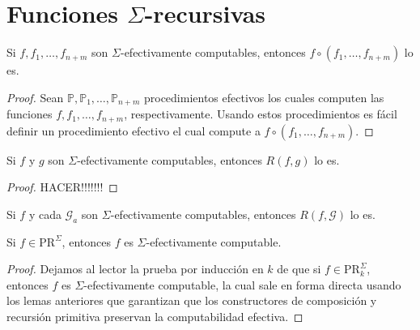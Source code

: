 \section{Funciones $\Sigma$-recursivas}

  \begin{lemma}
    \par Si $f, f_{1}, \dotsc, f_{n+m}$ son $\Sigma$-efectivamente computables, entonces $f \circ (f_{1}, \dotsc,
    f_{n+m})$ lo es.
  \end{lemma}
  \begin{proof}
    Sean $\mathbb{P}, \mathbb{P}_{1}, \dotsc, \mathbb{P}_{n+m}$ procedimientos efectivos los cuales computen las
    funciones $f, f_{1}, \dotsc, f_{n+m}$, respectivamente. Usando estos procedimientos es fácil definir un
    procedimiento efectivo el cual compute a $f \circ (f_{1},\dotsc,f_{n+m})$.
  \end{proof}

  \begin{lemma}
    \par Si $f$ y $g$ son $\Sigma $-efectivamente computables, entonces $R(f,g)$ lo es.
  \end{lemma}
  \begin{proof}
    HACER!!!!!!!
  \end{proof}

  \begin{lemma}
    \par Si $f$ y cada $\mathcal{G}_{a}$ son $\Sigma$-efectivamente computables, entonces $R(f, \mathcal{G})$ lo es.
  \end{lemma}

  \begin{theorem}
    \par Si $f \in \mathrm{PR}^{\Sigma}$, entonces $f$ es $\Sigma$-efectivamente computable.
  \end{theorem}
  \begin{proof}
    \par Dejamos al lector la prueba por inducción en $k$ de que si $f \in \mathrm{PR}_{k}^{\Sigma}$, entonces $f$ es
    $\Sigma$-efectivamente computable, la cual sale en forma directa usando los lemas anteriores que garantizan que los
    constructores de composición y recursión primitiva preservan la computabilidad efectiva.
  \end{proof}

